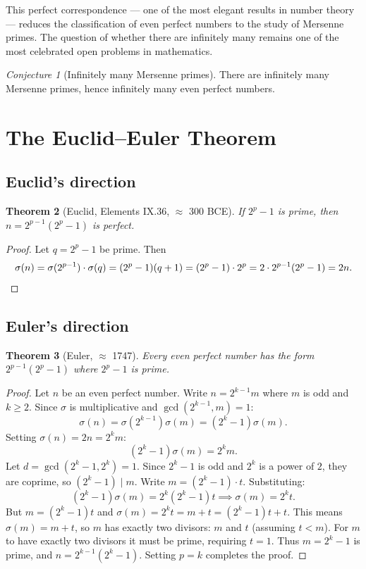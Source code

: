 \documentclass[12pt,a4paper]{amsart}
\newtheorem{theorem}{Theorem}[section]
\theoremstyle{definition}
\theoremstyle{remark}
\newtheorem{conjecture}[theorem]{Conjecture}
\begin{document}
This perfect correspondence --- one of the most elegant results in number
theory --- reduces the classification of even perfect numbers to the study
of Mersenne primes.
The question of whether there are infinitely many remains one of the most
celebrated open problems in mathematics.

\begin{conjecture}[Infinitely many Mersenne primes]
\label{conj:inf}
There are infinitely many Mersenne primes, hence infinitely many even
perfect numbers.
\end{conjecture}

\section{The Euclid--Euler Theorem}

\subsection{Euclid's direction}

\begin{theorem}[Euclid, Elements IX.36, $\approx$ 300 BCE]
If $2^p - 1$ is prime, then $n = 2^{p-1}(2^p - 1)$ is perfect.
\end{theorem}

\begin{proof}
Let $q = 2^p - 1$ be prime. Then
\[
  \sigma(n) = \sigma(2^{p-1}) \cdot \sigma(q)
  = (2^p - 1)(q + 1)
  = (2^p - 1) \cdot 2^p
  = 2 \cdot 2^{p-1}(2^p - 1) = 2n. \qedhere
\]
\end{proof}

\subsection{Euler's direction}

\begin{theorem}[Euler, $\approx$ 1747]
Every even perfect number has the form $2^{p-1}(2^p - 1)$ where $2^p - 1$
is prime.
\end{theorem}

\begin{proof}
Let $n$ be an even perfect number. Write $n = 2^{k-1} m$ where $m$ is odd
and $k \geq 2$.
Since $\sigma$ is multiplicative and $\gcd(2^{k-1}, m) = 1$:
\[
  \sigma(n) = \sigma(2^{k-1})\sigma(m) = (2^k - 1)\sigma(m).
\]
Setting $\sigma(n) = 2n = 2^k m$:
\[
  (2^k - 1)\sigma(m) = 2^k m.
\]
Let $d = \gcd(2^k - 1, 2^k) = 1$. Since $2^k - 1$ is odd and $2^k$ is a
power of $2$, they are coprime, so $(2^k - 1) \mid m$.
Write $m = (2^k - 1) \cdot t$. Substituting:
\[
  (2^k - 1)\sigma(m) = 2^k(2^k-1)t \implies \sigma(m) = 2^k t.
\]
But $m = (2^k-1)t$ and $\sigma(m) = 2^k t = m + t = (2^k - 1)t + t$.
This means $\sigma(m) = m + t$, so $m$ has exactly two divisors: $m$ and $t$
(assuming $t < m$).
For $m$ to have exactly two divisors it must be prime, requiring $t = 1$.
Thus $m = 2^k - 1$ is prime, and $n = 2^{k-1}(2^k - 1)$.
Setting $p = k$ completes the proof.
\end{proof}
\end{document}
